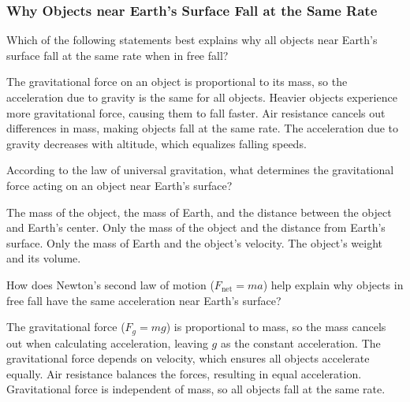 \documentclass[../main-physics-problems.tex]{subfiles}
\begin{document}
\subsubsection{Why Objects near Earth's Surface Fall at the
Same Rate}

\begin{questions}  


\question  
Which of the following statements best explains why all objects near Earth’s surface fall at the same rate when in free fall?  

\begin{randomizechoices}  
    \correctchoice The gravitational force on an object is proportional to its mass, so the acceleration due to gravity is the same for all objects.  
    \choice Heavier objects experience more gravitational force, causing them to fall faster.  
    \choice Air resistance cancels out differences in mass, making objects fall at the same rate.  
    \choice The acceleration due to gravity decreases with altitude, which equalizes falling speeds.  
\end{randomizechoices}  


\question  
According to the law of universal gravitation, what determines the gravitational force acting on an object near Earth’s surface?  

\begin{randomizechoices}  
    \correctchoice The mass of the object, the mass of Earth, and the distance between the object and Earth’s center.  
    \choice Only the mass of the object and the distance from Earth’s surface.  
    \choice Only the mass of Earth and the object’s velocity.  
    \choice The object’s weight and its volume.  
\end{randomizechoices}  

\question  
How does Newton’s second law of motion (\( F_{\text{net}} = ma \)) help explain why objects in free fall have the same acceleration near Earth’s surface?  

\begin{randomizechoices}  
    \correctchoice The gravitational force (\( F_g = mg \)) is proportional to mass, so the mass cancels out when calculating acceleration, leaving \( g \) as the constant acceleration.  
    \choice The gravitational force depends on velocity, which ensures all objects accelerate equally.  
    \choice Air resistance balances the forces, resulting in equal acceleration.  
    \choice Gravitational force is independent of mass, so all objects fall at the same rate.  
\end{randomizechoices}  



\end{questions}
\end{document}
